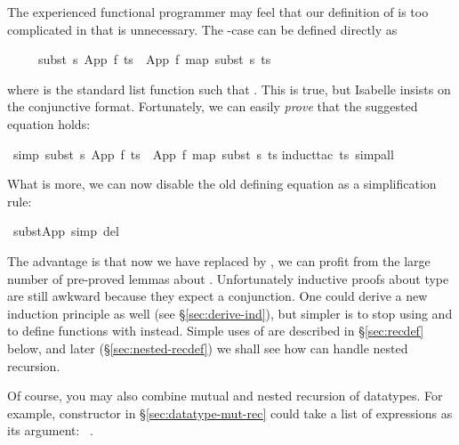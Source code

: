 \begin{isabellebody}
\begin{isamarkuptext}
The experienced functional programmer may feel that our definition of
 is too complicated in that  is
unnecessary. The -case can be defined directly as
\begin{isabelle}%
\ \ \ \ \ subst\ s\ {\isacharparenleft}App\ f\ ts{\isacharparenright}\ {\isacharequal}\ App\ f\ {\isacharparenleft}map\ {\isacharparenleft}subst\ s{\isacharparenright}\ ts{\isacharparenright}%
\end{isabelle}
where  is the standard list function such that
. This is true, but Isabelle
insists on the conjunctive format. Fortunately, we can easily \emph{prove}
that the suggested equation holds:%
\end{isamarkuptext}%
\isamarkuptrue%
\ {\isacharbrackleft}simp{\isacharbrackright}{\isacharcolon}\ {\isachardoublequote}subst\ s\ {\isacharparenleft}App\ f\ ts{\isacharparenright}\ {\isacharequal}\ App\ f\ {\isacharparenleft}map\ {\isacharparenleft}subst\ s{\isacharparenright}\ ts{\isacharparenright}{\isachardoublequote}\isanewline
\isamarkupfalse%
induct{\isacharunderscore}tac\ ts{\isacharcomma}\ simp{\isacharunderscore}all{\isacharparenright}\isanewline
\isamarkupfalse%
\isamarkupfalse%
%
\begin{isamarkuptext}%
\noindent
What is more, we can now disable the old defining equation as a
simplification rule:%
\end{isamarkuptext}%
\isamarkuptrue%
\ subst{\isacharunderscore}App\ {\isacharbrackleft}simp\ del{\isacharbrackright}\isamarkupfalse%
%
\begin{isamarkuptext}%
\noindent
The advantage is that now we have replaced  by
, we can profit from the large number of pre-proved lemmas
about .  Unfortunately inductive proofs about type
 are still awkward because they expect a conjunction. One
could derive a new induction principle as well (see
\S\ref{sec:derive-ind}), but simpler is to stop using 
and to define functions with  instead.
Simple uses of  are described in \S\ref{sec:recdef} below,
and later (\S\ref{sec:nested-recdef}) we shall see how  can 
handle nested recursion.

Of course, you may also combine mutual and nested recursion of datatypes. For example,
constructor  in \S\ref{sec:datatype-mut-rec} could take a list of
expressions as its argument: ~.%
\end{isamarkuptext}%
\isamarkuptrue%
\isamarkupfalse%
\end{isabellebody}%
